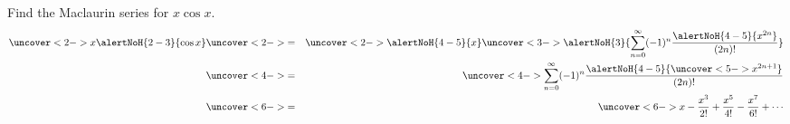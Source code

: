 \begin{frame}
\begin{example}[Example 6, p. 776]
Find the Maclaurin series for $x\cos x$.
\abovedisplayskip=0pt
\belowdisplayskip=0pt
\begin{eqnarray*}
\uncover<2->{%
x\alertNoH{ 2-3}{\cos x}%
}%
& \uncover<2->{=} &%
\uncover<2->{\alertNoH{ 4-5}{x}}%
\uncover<3->{%
\alertNoH{ 3}{\sum_{n=0}^\infty (-1)^n\frac{\alertNoH{ 4-5}{x^{2n}}}{(2n)!}}%
}\\%
& \uncover<4->{=} &%
\uncover<4->{%
\sum_{n=0}^\infty (-1)^n\frac{\alertNoH{ 4-5}{\uncover<5->{x^{2n+1}}}}{(2n)!}%
}\\%
& \uncover<6->{=} &%
\uncover<6->{%
x - \frac{x^3}{2!} + \frac{x^5}{4!} - \frac{x^7}{6!} + \cdots%
}%
\end{eqnarray*}
\end{example}
\end{frame}
